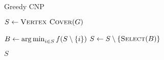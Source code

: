 \begin{algorithm}[t]
  \caption{Greedy CNP}\label{alg:GREEDY_ALGORITMUS}
  \begin{algorithmic}[1]
    \State $S \leftarrow \Call{Vertex Cover}{G}$

    \State $B \leftarrow \operatorname*{arg\,min}_{i \in S} f(S \setminus \left\{ i \right\})$
    \State $S \leftarrow S \setminus \left\{ \Call{Select}{B} \right\}$
    \EndWhile

    \State \Return $S$
    \EndFunction
  \end{algorithmic}
\end{algorithm}
